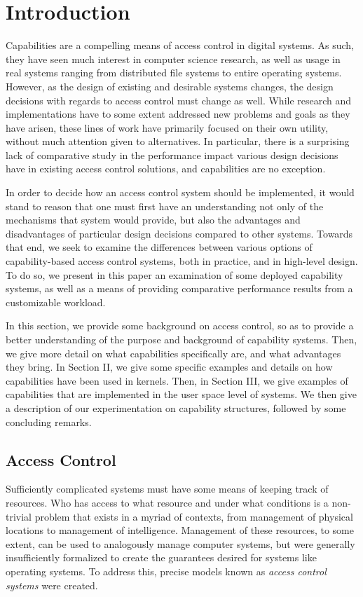\section{Introduction}
\label{sec:Introduction}
Capabilities are a compelling means of access control in digital systems. As such, they have seen much interest in computer science research, as well as usage in real systems ranging from distributed file systems to entire operating systems. However, as the design of existing and desirable systems changes, the design decisions with regards to access control must change as well. While research and implementations have to some extent addressed new problems and goals as they have arisen, these lines of work have primarily focused on their own utility, without much attention given to alternatives. In particular, there is a surprising lack of comparative study in the performance impact various design decisions have in existing access control solutions, and capabilities are no exception.

In order to decide how an access control system should be implemented, it would stand to reason that one must first have an understanding not only of the mechanisms that system would provide, but also the advantages and disadvantages of particular design decisions compared to other systems. Towards that end, we seek to examine the differences between various options of capability-based access control systems, both in practice, and in high-level design. To do so, we present in this paper an examination of some deployed capability systems, as well as a means of providing comparative performance results from a customizable workload.

In this section, we provide some background on access control, so as to provide a better understanding of the purpose and background of capability systems. Then, we give more detail on what capabilities specifically are, and what advantages they bring. In Section II, we give some specific examples and details on how capabilities have been used in kernels. Then, in Section III, we give examples of capabilities that are implemented in the user space level of systems. We then give a description of our experimentation on capability structures, followed by some concluding remarks.

\subsection{Access Control}
Sufficiently complicated systems must have some means of keeping track of resources. Who has access to what resource and under what conditions is a non-trivial problem that exists in a myriad of contexts, from management of physical locations to management of intelligence. Management of these resources, to some extent, can be used to analogously manage computer systems, but were generally insufficiently formalized to create the guarantees desired for systems like operating systems. To address this, precise models known as {\em access control systems} were created.

